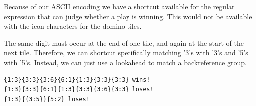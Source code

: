 \newpage

Because of our ASCII encoding we have a shortcut available for the
regular expression that can judge whether a play is winning. This would
not be available with the icon characters for the domino tiles.

The same digit must occur at the end of one tile, and again at the start
of the next tile. Therefore, we can shortcut specifically matching '3's
with '3's and '5's with '5's. Instead, we can just use a lookahead to
match a backreference group.

\begin{Shaded}
\begin{Highlighting}[]
\OperatorTok{\textgreater{}\textgreater{}\textgreater{}}\OperatorTok{=}  \StringTok{\textquotesingle{}}\StringTok{\textquotesingle{}}
\OperatorTok{\textgreater{}\textgreater{}\textgreater{}}\OperatorTok{=}   \StringTok{\textquotesingle{}}\StringTok{\textquotesingle{}} 
\OperatorTok{\textgreater{}\textgreater{}\textgreater{}}\OperatorTok{=} \StringTok{\textquotesingle{}}\StringTok{\textquotesingle{}} 

\OperatorTok{\textgreater{}\textgreater{}\textgreater{}}\OperatorTok{=} 

\OperatorTok{\textgreater{}\textgreater{}\textgreater{}} 
\OperatorTok{=}
\NormalTok{)}
\NormalTok{:}
\NormalTok{)}
\end{Highlighting}
\end{Shaded}

\begin{verbatim}
{1:3}{3:3}{3:6}{6:1}{1:3}{3:3}{3:3} wins!
{1:3}{3:3}{6:1}{1:3}{3:3}{3:6}{3:3} loses!
{1:3}{{3:5}}{5:2} loses!
\end{verbatim}

